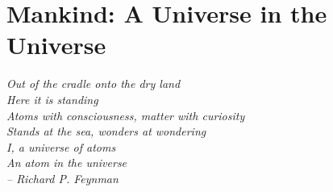 \chapter{Mankind: A Universe in the Universe}

{\itshape
Out of the cradle onto the dry land\\
Here it is standing\\
Atoms with consciousness, matter with curiosity\\
Stands at the sea, wonders at wondering\\

I, a universe of atoms\\
An atom in the universe\\

-- Richard P. Feynman
}
